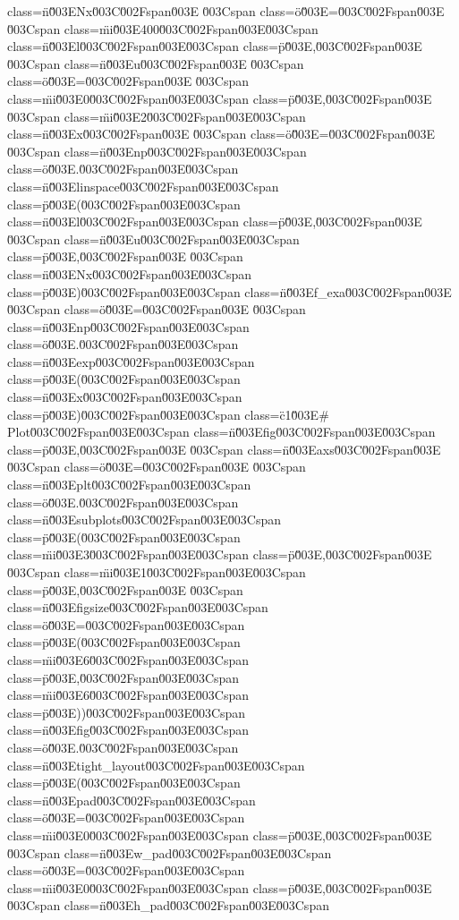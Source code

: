 class=\"n\"\u003ENx\u003C\u002Fspan\u003E \u003Cspan class=\"o\"\u003E=\u003C\u002Fspan\u003E \u003Cspan class=\"mi\"\u003E400\u003C\u002Fspan\u003E\n\u003Cspan class=\"n\"\u003El\u003C\u002Fspan\u003E\u003Cspan class=\"p\"\u003E,\u003C\u002Fspan\u003E \u003Cspan class=\"n\"\u003Eu\u003C\u002Fspan\u003E \u003Cspan class=\"o\"\u003E=\u003C\u002Fspan\u003E \u003Cspan class=\"mi\"\u003E0\u003C\u002Fspan\u003E\u003Cspan class=\"p\"\u003E,\u003C\u002Fspan\u003E \u003Cspan class=\"mi\"\u003E2\u003C\u002Fspan\u003E\n\u003Cspan class=\"n\"\u003Ex\u003C\u002Fspan\u003E \u003Cspan class=\"o\"\u003E=\u003C\u002Fspan\u003E \u003Cspan class=\"n\"\u003Enp\u003C\u002Fspan\u003E\u003Cspan class=\"o\"\u003E.\u003C\u002Fspan\u003E\u003Cspan class=\"n\"\u003Elinspace\u003C\u002Fspan\u003E\u003Cspan class=\"p\"\u003E(\u003C\u002Fspan\u003E\u003Cspan class=\"n\"\u003El\u003C\u002Fspan\u003E\u003Cspan class=\"p\"\u003E,\u003C\u002Fspan\u003E \u003Cspan class=\"n\"\u003Eu\u003C\u002Fspan\u003E\u003Cspan class=\"p\"\u003E,\u003C\u002Fspan\u003E \u003Cspan class=\"n\"\u003ENx\u003C\u002Fspan\u003E\u003Cspan class=\"p\"\u003E)\u003C\u002Fspan\u003E\n\u003Cspan class=\"n\"\u003Ef_exa\u003C\u002Fspan\u003E \u003Cspan class=\"o\"\u003E=\u003C\u002Fspan\u003E \u003Cspan class=\"n\"\u003Enp\u003C\u002Fspan\u003E\u003Cspan class=\"o\"\u003E.\u003C\u002Fspan\u003E\u003Cspan class=\"n\"\u003Eexp\u003C\u002Fspan\u003E\u003Cspan class=\"p\"\u003E(\u003C\u002Fspan\u003E\u003Cspan class=\"n\"\u003Ex\u003C\u002Fspan\u003E\u003Cspan class=\"p\"\u003E)\u003C\u002Fspan\u003E\n\n\u003Cspan class=\"c1\"\u003E# Plot\u003C\u002Fspan\u003E\n\u003Cspan class=\"n\"\u003Efig\u003C\u002Fspan\u003E\u003Cspan class=\"p\"\u003E,\u003C\u002Fspan\u003E \u003Cspan class=\"n\"\u003Eaxs\u003C\u002Fspan\u003E \u003Cspan class=\"o\"\u003E=\u003C\u002Fspan\u003E \u003Cspan class=\"n\"\u003Eplt\u003C\u002Fspan\u003E\u003Cspan class=\"o\"\u003E.\u003C\u002Fspan\u003E\u003Cspan class=\"n\"\u003Esubplots\u003C\u002Fspan\u003E\u003Cspan class=\"p\"\u003E(\u003C\u002Fspan\u003E\u003Cspan class=\"mi\"\u003E3\u003C\u002Fspan\u003E\u003Cspan class=\"p\"\u003E,\u003C\u002Fspan\u003E \u003Cspan class=\"mi\"\u003E1\u003C\u002Fspan\u003E\u003Cspan class=\"p\"\u003E,\u003C\u002Fspan\u003E \u003Cspan class=\"n\"\u003Efigsize\u003C\u002Fspan\u003E\u003Cspan class=\"o\"\u003E=\u003C\u002Fspan\u003E\u003Cspan class=\"p\"\u003E(\u003C\u002Fspan\u003E\u003Cspan class=\"mi\"\u003E6\u003C\u002Fspan\u003E\u003Cspan class=\"p\"\u003E,\u003C\u002Fspan\u003E\u003Cspan class=\"mi\"\u003E6\u003C\u002Fspan\u003E\u003Cspan class=\"p\"\u003E))\u003C\u002Fspan\u003E\n\u003Cspan class=\"n\"\u003Efig\u003C\u002Fspan\u003E\u003Cspan class=\"o\"\u003E.\u003C\u002Fspan\u003E\u003Cspan class=\"n\"\u003Etight_layout\u003C\u002Fspan\u003E\u003Cspan class=\"p\"\u003E(\u003C\u002Fspan\u003E\u003Cspan class=\"n\"\u003Epad\u003C\u002Fspan\u003E\u003Cspan class=\"o\"\u003E=\u003C\u002Fspan\u003E\u003Cspan class=\"mi\"\u003E0\u003C\u002Fspan\u003E\u003Cspan class=\"p\"\u003E,\u003C\u002Fspan\u003E \u003Cspan class=\"n\"\u003Ew_pad\u003C\u002Fspan\u003E\u003Cspan class=\"o\"\u003E=\u003C\u002Fspan\u003E\u003Cspan class=\"mi\"\u003E0\u003C\u002Fspan\u003E\u003Cspan class=\"p\"\u003E,\u003C\u002Fspan\u003E \u003Cspan class=\"n\"\u003Eh_pad\u003C\u002Fspan\u003E\u003Cspan 